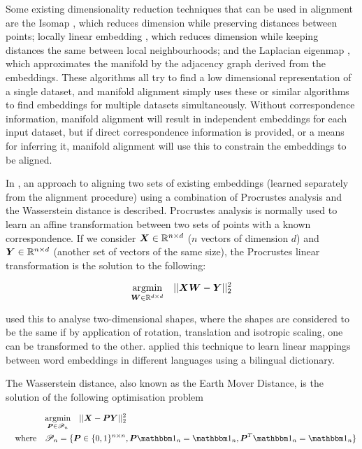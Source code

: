 Some existing dimensionality reduction techniques that can be used in alignment are the Isomap \cite{Isomap}, which reduces dimension while preserving distances between points; locally linear embedding \cite {LocallyLinearEmbedding}, which reduces dimension while keeping distances the same between local neighbourhoods; and the Laplacian eigenmap \cite{LaplacianEigenmaps}, which approximates the manifold by the adjacency graph derived from the embeddings. These algorithms all try to find a low dimensional representation of a single dataset, and manifold alignment simply uses these or similar algorithms to find embeddings for multiple datasets simultaneously. Without correspondence information, manifold alignment will result in independent embeddings for each input dataset, but if direct correspondence information is provided, or a means for inferring it, manifold alignment will use this to constrain the embeddings to be aligned. %

In \cite{UnsupervisedAlignmentWP}, an approach to aligning two sets of existing embeddings (learned separately from the alignment procedure) using a combination of Procrustes analysis and the Wasserstein distance is described. Procrustes analysis is normally used to learn an affine transformation between two sets of points with a known correspondence. If we consider $\boldsymbol{X} \in \mathbb{R}^{n \times d}$ ($n$ vectors of dimension $d$) and $\boldsymbol{Y} \in \mathbb{R}^{n \times d}$ (another set of vectors of the same size), the Procrustes linear transformation is the solution to the following:

\begin{equation*}
    \underset{\boldsymbol{W} \in \mathbb{R}^{d \times d}}{\operatorname{argmin}} \quad  ||\boldsymbol{X} \boldsymbol{W} - \boldsymbol{Y}||_2^2
\end{equation*}

\cite{Goodall1991ProcrustesMI} used this to analyse two-dimensional shapes, where the shapes are considered to be the same if by application of rotation, translation and isotropic scaling, one can be transformed to the other. \cite{MikolovMachineTranslation} applied this technique to learn linear mappings between word embeddings in different languages using a bilingual dictionary. 

The Wasserstein distance, also known as the Earth Mover Distance, is the solution of the following optimisation problem

\begin{equation*}
\begin{split}
    &\argmin{\vecP \in \mathscr{P}_n} \quad || \vecX - \vecP \vecY ||_2^2 \\
    \spaced{where}&\mathscr{P}_n = \{\vecP \in \{0, 1\}^{n \times n}, \vecP \one_n = \one_n, \vecP^T \one_n = \one_n \}
\end{split}
\end{equation*}

